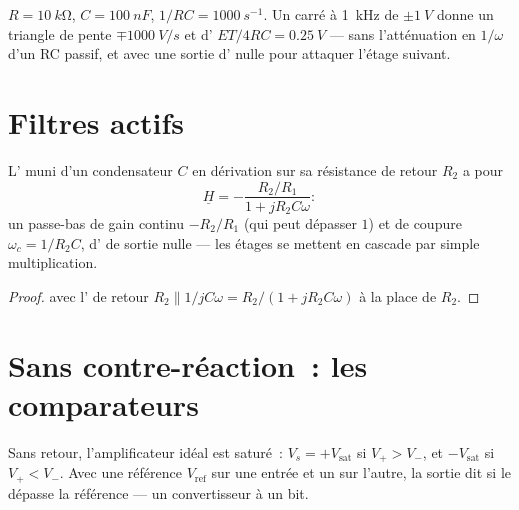 \begin{example}\label{ex:b1:operational-amplifier:triangle}
$R = \qty{10}{k\ohm}$, $C = \qty{100}{nF}$, $1/RC = \qty{1000}{s^{-1}}$.
Un  carré à \qty{1}{kHz} de $\pm\qty{1}{V}$ donne un triangle de
pente $\mp\qty{1000}{V/s}$ et d' $ET/4RC = \qty{0.25}{V}$ ---
sans l'atténuation en $1/\omega$ d'un RC passif, et avec une sortie
d' nulle pour attaquer l'étage suivant.
\end{example}

\section{Filtres actifs}

\begin{proposition}\label{prop:b1:operational-amplifier:activelp}
L' muni d'un condensateur $C$ en dérivation sur
sa résistance de retour $R_2$ a pour 
\[
\underline H = -\frac{R_2/R_1}{1 + jR_2C\omega}:
\]
un passe-bas de gain continu $-R_2/R_1$ (qui peut dépasser $1$) et de
coupure $\omega_c = 1/R_2C$, d' de sortie nulle --- les étages
se mettent en cascade par simple multiplication.
\end{proposition}

\begin{proof}
 avec l' de retour $R_2 \parallel 1/jC\omega
= R_2/(1 + jR_2C\omega)$ à la place de $R_2$.
\end{proof}

\section{Sans contre-réaction~: les comparateurs}

\begin{proposition}[Comparateur]\label{prop:b1:operational-amplifier:comparator}
Sans retour, l'amplificateur idéal est saturé~:
$V_s = +V_{\mathrm{sat}}$ si $V_+ > V_-$, et $-V_{\mathrm{sat}}$ si
$V_+ < V_-$. Avec une référence $V_{\mathrm{ref}}$ sur une entrée et un
 sur l'autre, la sortie dit si le  dépasse la référence ---
un convertisseur à un bit.
\end{proposition}

